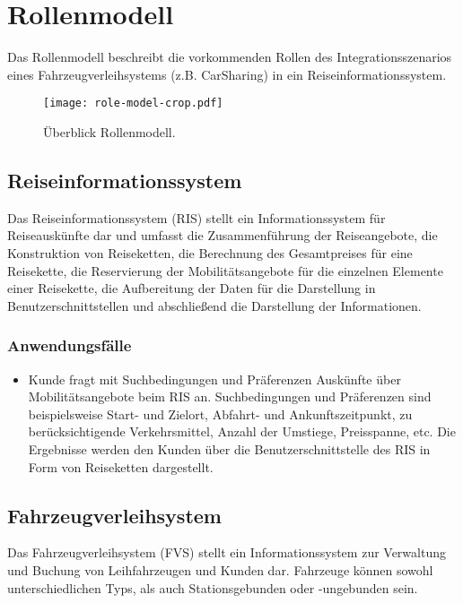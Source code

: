 \chapter{Rollenmodell}
\label{cha:Rollenmodell}

Das Rollenmodell beschreibt die vorkommenden Rollen des Integrationsszenarios eines Fahrzeugverleihsystems (z.B. CarSharing) in ein Reiseinformationssystem.

\begin{figure*}[ht]
\centering
\texttt{[image: role-model-crop.pdf]}
\caption{Überblick Rollenmodell.\label{fig:Rollenmodell}}
\end{figure*}

\section*{Reiseinformationssystem}
\label{sec:Rollenmodell:RIS}
Das Reiseinformationssystem (RIS) stellt ein Informationssystem für Reiseauskünfte dar und umfasst die Zusammenführung der Reiseangebote, die Konstruktion von Reiseketten, die Berechnung des Gesamtpreises für eine Reisekette, die Reservierung der Mobilitätsangebote für die einzelnen Elemente einer Reisekette, die Aufbereitung der Daten für die Darstellung in Benutzerschnittstellen und abschließend die Darstellung der Informationen.

\subsection*{Anwendungsfälle}
\begin{itemize}
\item Kunde fragt mit Suchbedingungen und Präferenzen Auskünfte über Mobilitätsangebote beim RIS an. Suchbedingungen und Präferenzen sind beispielsweise Start- und Zielort, Abfahrt- und Ankunftszeitpunkt, zu berücksichtigende Verkehrsmittel, Anzahl der Umstiege, Preisspanne, etc. Die Ergebnisse werden den Kunden über die Benutzerschnittstelle des RIS in Form von Reiseketten dargestellt.
\end{itemize}

\section*{Fahrzeugverleihsystem}
\label{sec:Rollenmodell:FVS}
Das Fahrzeugverleihsystem (FVS) stellt ein Informationssystem zur Verwaltung und Buchung von Leihfahrzeugen und Kunden dar. Fahrzeuge können sowohl unterschiedlichen Typs, als auch Stationsgebunden oder -ungebunden sein.

